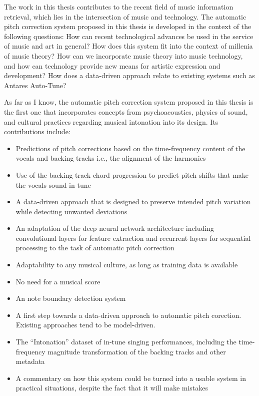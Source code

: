The work in this thesis contributes to the recent field of music information retrieval, which lies in the intersection of music and technology. The automatic pitch correction system proposed in this thesis is developed in the context of the following questions: How can recent technological advances be used in the service of music and art in general? How does this system fit into the context of millenia of music theory? How can we incorporate music theory into music technology, and how can technology provide new means for artistic expression and development? How does a data-driven approach relate to existing systems such as Antares Auto-Tune? 

As far as I know, the automatic pitch correction system proposed in this thesis is the first one that incorporates concepts from psychoacoustics, physics of sound, and cultural practices regarding musical intonation into its design. Its contributions include:
\begin{itemize}
    \item Predictions of pitch corrections based on the time-frequency content of the vocals and backing tracks i.e., the alignment of the harmonics
    \item Use of the backing track chord progression to predict pitch shifts that make the vocals sound in tune
    \item A data-driven approach that is designed to preserve intended pitch variation while detecting unwanted deviations
    \item An adaptation of the deep neural network architecture including convolutional layers for feature extraction and recurrent layers for sequential processing to the task of automatic pitch correction
    \item Adaptability to any musical culture, as long as training data is available
    \item No need for a musical score
    \item An note boundary detection system
    \item A first step towards a data-driven approach to automatic pitch corection. Existing approaches tend to be model-driven.
    \item The ``Intonation'' dataset of in-tune singing performances, including the time-frequency magnitude transformation of the backing tracks and other metadata
    \item A commentary on how this system could be turned into a usable system in practical situations, despite the fact that it will make mistakes
\end{itemize}

